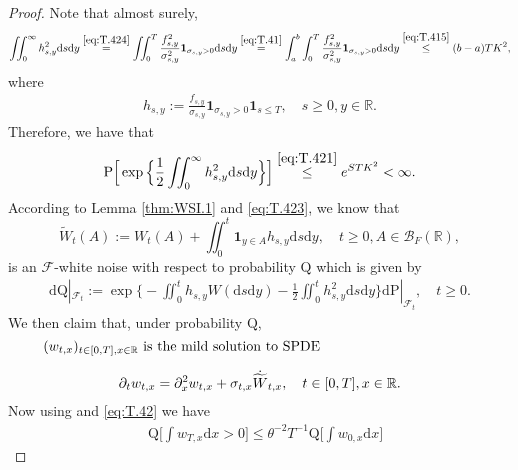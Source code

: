 \documentclass[12pt,a4paper]{amsart}
\numberwithin{equation}{section}
\theoremstyle{plain}
\theoremstyle{remark}
\begin{document}
\begin{proof}
	Note that almost surely,
\begin{equation} \label{eq:T.421}
 \iint_0^\infty h_{s,y}^2\mathrm ds\mathrm dy 
\overset{\eqref{eq:T.424}}= \iint_0^T \frac{f_{s,y}^2}{\sigma_{s,y}^2} \mathbf 1_{\sigma_{s,y}>0}\mathrm ds\mathrm dy
\overset{\eqref{eq:T.41}}=  \int_{a}^b\int_0^T \frac{f_{s,y}^2}{\sigma_{s,y}^2} \mathbf 1_{\sigma_{s,y}>0}\mathrm ds\mathrm dy
\overset{\eqref{eq:T.415}}\leq (b-a)TK^2,
\end{equation}
	where 
	\begin{align}\label{eq:T.424}
	h_{s,y} := \frac{f_{s,y}}{\sigma_{s,y}} \mathbf 1_{\sigma_{s,y}> 0} \mathbf 1_{s\leq T}, \quad s\geq 0, y \in \mathbb R.
	\end{align}
	Therefore, we have that
\begin{equation} \label{eq:T.423}
\mathrm P\Big[\exp\Big\{\frac{1}{2} \iint_0^\infty h_{s,y}^2\mathrm ds\mathrm dy\Big\}\Big]
\overset{\eqref{eq:T.421}}\leq e^{STK^2}<\infty.
\end{equation}
	According to Lemma \ref{thm:WSI.1} and \eqref{eq:T.423}, we know that
\begin{equation} \label{eq:T.425}
\widetilde W_t(A) :=  W_t(A) + \iint_0^t  \mathbf 1_{y\in A} h_{s,y} \mathrm ds\mathrm dy, \quad t\geq 0, A\in \mathcal B_F(\mathbb R),
\end{equation}
	is an $\mathcal F$-white noise with respect to probability $\mathrm Q$ which is given by 
\begin{align}	\label{eq:T.43}
	\mathrm d\mathrm Q|_{\mathcal F_t} := \exp\Big\{-\iint_0^t h_{s,y} W(\mathrm ds\mathrm dy) - \frac{1}{2} \iint_0^t h^2_{s,y} \mathrm ds\mathrm dy\Big\} \mathrm d\mathrm P|_{\mathcal F_t}, \quad t\geq 0.
\end{align}
	We then claim that, under probability $\mathrm Q$, 
\begin{equation}\label{eq:T.433}
\begin{minipage}{0.9\textwidth}
	$(w_{t,x})_{t\in [0,T], x\in \mathbb R}$ is the mild solution to SPDE
	\[ 
	\partial_t w_{t,x} = \partial_x^2 w_{t,x} +  \sigma_{t,x} \dot {\widetilde W}_{t,x}, \quad t\in [0,T], x\in \mathbb R.
	\]
\end{minipage}
\end{equation}
	Now using \cite[Lemma 8.1]{MuellerMytnikQuastel2011Effect} and \eqref{eq:T.42} we have
\begin{align} \label{eq:T.435}
& \mathrm Q\Big[\int w_{T,x}\mathrm dx > 0\Big] 
\leq \theta^{-2} T^{-1} \mathrm Q\Big[\int w_{0,x}\mathrm dx\Big]

\end{align}
\end{proof}
\end{document}
